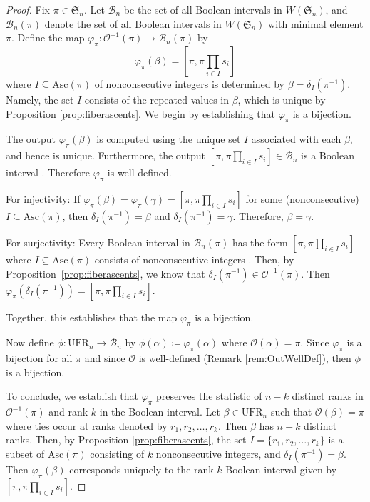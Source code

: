 \documentclass[11pt,reqno]{amsart}
\newcommand{\Asc}{\mathrm{Asc}}
\newcommand{\Out}{\mathcal{O}}
\newcommand{\Sym}{\mathfrak{S}}
\newcommand{\ufr}[1]{\mathrm{UFR}_{#1}}
\begin{document}
\begin{proof}
Fix $\pi\in \Sym_{n}$.
Let $\mathcal{B}_n$ be the set of all Boolean intervals in $W(\Sym_n)$, and $\mathcal{B}_n(\pi)$ denote the set of all Boolean intervals in $W(\Sym_n)$ with minimal element $\pi$.
Define the map $\varphi_\pi: \Out^{-1}(\pi) \rightarrow \mathcal{B}_n(\pi)$ by
\[
    \varphi_\pi(\beta) = \left[\pi, \pi \prod_{i\in I} s_i\right]
\]
where $I \subseteq \Asc(\pi)$ of nonconsecutive integers is determined by $\beta=\delta_I(\pi^{-1})$. 
Namely, the set  $I$ consists of the repeated values in $\beta$, which is unique by Proposition \ref{prop:fiberascents}.
We begin by establishing that $\varphi_\pi$ is a bijection. 

The output $\varphi_\pi(\beta)$ is computed using the unique set $I$ associated with each $\beta$, and hence is unique. Furthermore, the output $[\pi, \pi \prod_{i\in I} s_i]\in \mathcal{B}_n$ is a Boolean interval \cite[Corollary 4.4]{tenner2022interval}.
Therefore $\varphi_\pi$ is well-defined.

For injectivity: If $\varphi_\pi(\beta)=\varphi_\pi(\gamma)=[\pi, \pi \prod_{i\in I} s_i]$ for some (nonconsecutive) $I\subseteq \Asc(\pi)$, then  $\delta_{I}(\pi^{-1})=\beta$
and $\delta_{I}(\pi^{-1})=\gamma$. Therefore, $\beta=\gamma$.

For surjectivity: Every Boolean interval in $\mathcal{B}_n(\pi)$ has the form $[\pi, \pi \prod_{i\in I} s_i]$ where $I\subseteq \Asc(\pi)$ consists of nonconsecutive integers \cite[Corollary 4.4]{tenner2022interval}. Then, by Proposition~\ref{prop:fiberascents}, we know that $\delta_{I}(\pi^{-1})\in\Out^{-1}(\pi)$. Then $\varphi_\pi(\delta_I(\pi^{-1}))=[\pi, \pi \prod_{i\in I} s_i]$.

Together, this establishes that the map $\varphi_\pi$ is a bijection. 

Now define 
$\phi:\ufr{n}\to\mathcal{B}_n$ by
$\phi(\alpha)\coloneqq\varphi_\pi(\alpha)$
where $\Out(\alpha)=\pi$.
Since $\varphi_\pi$ is a bijection for all $\pi$ and since $\Out$ is well-defined (Remark \ref{rem:OutWellDef}), then $\phi$ is a bijection.


To conclude, we establish that $\varphi_\pi$ preserves the statistic of $n-k$ distinct ranks in $\Out^{-1}(\pi)$ and rank $k$ in the Boolean interval. 
Let $\beta \in \ufr{n}$ such that $\Out(\beta)=\pi$ where ties occur at ranks denoted by $r_1,r_2,\ldots,r_k$. Then $\beta$ has $n-k$ distinct ranks.
Then, by Proposition \ref{prop:fiberascents}, the set $I=\{r_1,r_2,\ldots ,r_{k}\}$ is a subset of $\Asc(\pi)$ consisting of $k$ nonconsecutive integers, and $\delta_I(\pi^{-1})=\beta$. 
Then $\varphi_\pi(\beta)$ corresponds uniquely to the rank $k$ Boolean interval given by $[\pi, \pi \prod_{i\in I} s_i]$.
\end{proof}
\end{document}
